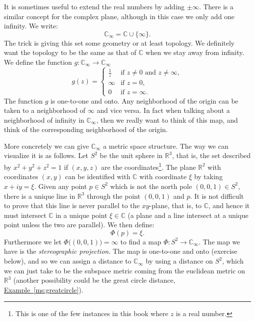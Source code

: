 \documentclass[12pt,openany]{book}
\newcommand{\C}{{\mathbb{C}}}
\newcommand{\R}{{\mathbb{R}}}
\theoremstyle{plain}
\theoremstyle{remark}
\theoremstyle{definition}
\theoremstyle{exercise}
\theoremstyle{example}
\newcommand{\exampleref}[1]{\hyperref[#1]{Example~\ref*{#1}}}
\begin{document}
It is sometimes useful to extend the real numbers by adding $\pm \infty$.
There is a similar concept for the complex plane, although in this case
we only add one infinity.  We write:
\begin{equation*}
\C_{\infty} = \C \cup \{ \infty \} .
\end{equation*}
The trick is giving this set some geometry or at least topology.  We
definitely want the topology to be the same as that of $\C$ when we stay
away from infinity.  We define the function $g \colon \C_\infty \to \C_\infty$
\begin{equation*}
g(z) =
\begin{cases}
\frac{1}{z} & \text{if } z \not= 0 \text{ and } z \not= \infty, \\
\infty & \text{if } z = 0, \\
0 & \text{if } z = \infty.
\end{cases}
\end{equation*}
The function $g$ is one-to-one and onto.
Any neighborhood of the origin can be taken to a neighborhood of
$\infty$ and vice versa.  In fact when talking about a neighborhood of
infinity in $\C_{\infty}$, then we really want to think of this map,
and think of the corresponding neighborhood of the origin.

More concretely we can give $\C_{\infty}$ a metric space structure.  The way
we can visualize it is as follows.  Let $S^2$ be the unit sphere in $\R^3$,
that is, the set described by $x^2 + y^2 + z^2 = 1$ if $(x,y,z)$ are the
coordinates\footnote{This is one of the few instances in this book where
$z$ is a real number.}.  The plane $\R^2$ with coordinates $(x,y)$ can be
identified with $\C$ with coordinate $\xi$ by taking $x+iy = \xi$.
Given any point $p \in S^2$ which is not the north pole $(0,0,1) \in S^2$,
there is a unique line in $\R^3$ through the point $(0,0,1)$ and $p$.
It is not difficult to prove that this line is never parallel to the
$xy$-plane, that is, to $\C$, and hence it must intersect $\C$ in a unique
point $\xi \in \C$ (a plane and a line intersect at a unique point unless
the two are parallel).  We then define:
\begin{equation*}
\Phi(p) = \xi.
\end{equation*}
Furthermore we let $\Phi\bigl((0,0,1)\bigr) = \infty$ to find a map
$\Phi \colon S^2 \to \C_\infty$.  The map we have is the
\emph{stereographic projection}.  The map is one-to-one and onto (exercise
below), and so we can assign a distance to $\C_\infty$ by
using a distance on $S^2$, which we can just take to be the subspace
metric coming from the euclidean metric on $\R^3$ (another possibility
could be the great circle distance, \exampleref{ms:greatcircle}).
\end{document}
